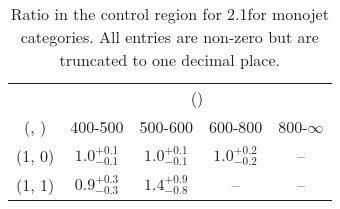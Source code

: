 \begin{table}[h!]
\tiny
\centering
\caption{Ratio in the \gj control region for 2.1\ifb for monojet categories. All entries are non-zero but are truncated to one decimal place.\label{tab:ratiosepnaive_gj_ewk_mono}}
\begin{tabular}
{ccccc}
	\hline\hline
	& \multicolumn{4}{c}{\scalht (\gev)} \\ 
	 (\njet,  \nb) & 400-500 & 500-600 & 600-800 & 800-$\infty$ \\ [0.8ex] 
\hline
	(1, 0) & $1.0^{+ 0.1 }_{- 0.1 }$ & $1.0^{+ 0.1 }_{- 0.1 }$ & $1.0^{+ 0.2 }_{- 0.2 }$ & -- \\[0.5ex] 
	(1, 1) & $0.9^{+ 0.3 }_{- 0.3 }$ & $1.4^{+ 0.9 }_{- 0.8 }$ & -- & -- \\[0.5ex] 
	\hline
	\hline
\end{tabular}
\end{table}
